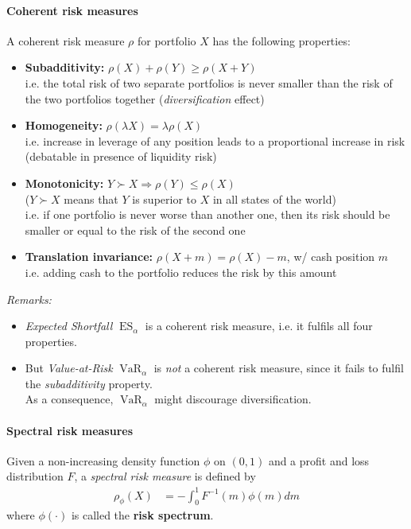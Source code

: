 \documentclass[a4paper,landscape,8pt,fleqn]{scrartcl}
\renewcommand{\emph}[1]{\textbf{#1}}
\DeclareMathOperator{\VaR}{VaR}				%
\DeclareMathOperator{\ES}{ES}					%
\begin{document}
\begin{multicols*}{3}
\paragraph{Coherent risk measures}
A coherent risk measure $\rho$ for portfolio $X$ has the following properties:
\begin{itemize}
\item \emph{Subadditivity:} $\rho(X) + \rho (Y) \geq \rho(X + Y)$ \\
i.e. the total risk of two separate portfolios is never smaller than the risk of the two portfolios together (\textit{diversification} effect)
\item \emph{Homogeneity:} $\rho(\lambda X) = \lambda \rho(X)$ \\
i.e. increase in leverage of any position leads to a proportional increase in risk (debatable in presence of liquidity risk)
\item \emph{Monotonicity:} $Y \succ X \Rightarrow \rho(Y) \leq \rho(X)$ \\
($Y \succ X$ means that $Y$ is superior to $X$ in all states of the world) \\
i.e. if one portfolio is never worse than another one, then its risk should be smaller or equal to the risk of the second one
\item \emph{Translation invariance:} $\rho(X+m) = \rho(X) -m$, w/ cash position $m$ \\
i.e. adding cash to the portfolio reduces the risk by this amount
\end{itemize}
\textit{Remarks:}
\begin{itemize}
\item \textit{Expected Shortfall} $\ES_\alpha$ is a coherent risk measure, i.e. it fulfils all four properties.
\item But \textit{Value-at-Risk} $\VaR_\alpha$ is \textit{not} a coherent risk measure, since it fails to fulfil the \textit{subadditivity} property. \\
As a consequence, $\VaR_\alpha$ might discourage diversification.
\end{itemize}

\paragraph{Spectral risk measures}
Given a non-increasing density function $\phi$ on $(0,1)$ and a profit and loss distribution $F$, a \textit{spectral risk measure} is defined by
\begin{align*}
\rho_\phi(X) &= -\int_0^1 F^{-1}(m) \phi(m) dm
\end{align*}
where $\phi(\cdot)$ is called the \emph{risk spectrum}.


\end{multicols*}
\end{document}
